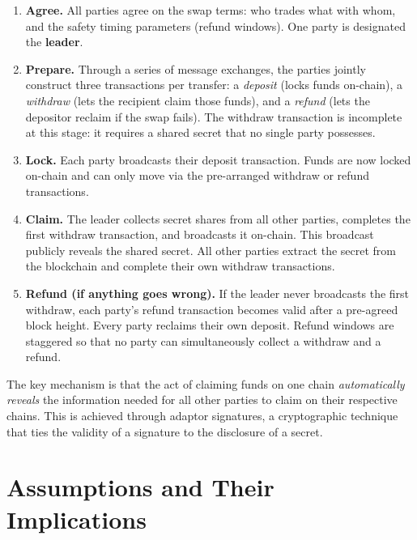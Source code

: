 \documentclass[11pt,a4paper]{article}
\begin{document}
\begin{enumerate}
  \item \textbf{Agree.}\;
    All parties agree on the swap terms: who trades what with whom, and the
    safety timing parameters (refund windows).
    One party is designated the \textbf{leader}.

  \item \textbf{Prepare.}\;
    Through a series of message exchanges, the parties jointly construct
    three transactions per transfer:
    a \emph{deposit} (locks funds on-chain),
    a \emph{withdraw} (lets the recipient claim those funds), and
    a \emph{refund} (lets the depositor reclaim if the swap fails).
    The withdraw transaction is incomplete at this stage: it requires a
    shared secret that no single party possesses.

  \item \textbf{Lock.}\;
    Each party broadcasts their deposit transaction.
    Funds are now locked on-chain and can only move via the pre-arranged
    withdraw or refund transactions.

  \item \textbf{Claim.}\;
    The leader collects secret shares from all other parties, completes the
    first withdraw transaction, and broadcasts it on-chain.
    This broadcast publicly reveals the shared secret.
    All other parties extract the secret from the blockchain and complete
    their own withdraw transactions.

  \item \textbf{Refund (if anything goes wrong).}\;
    If the leader never broadcasts the first withdraw, each party's refund
    transaction becomes valid after a pre-agreed block height.
    Every party reclaims their own deposit.
    Refund windows are staggered so that no party can simultaneously
    collect a withdraw and a refund.
\end{enumerate}

The key mechanism is that the act of claiming funds on one chain
\emph{automatically reveals} the information needed for all other parties
to claim on their respective chains.
This is achieved through adaptor signatures, a cryptographic technique that
ties the validity of a signature to the disclosure of a secret.

\section{Assumptions and Their Implications}
\label{sec:assumptions}
\end{document}
